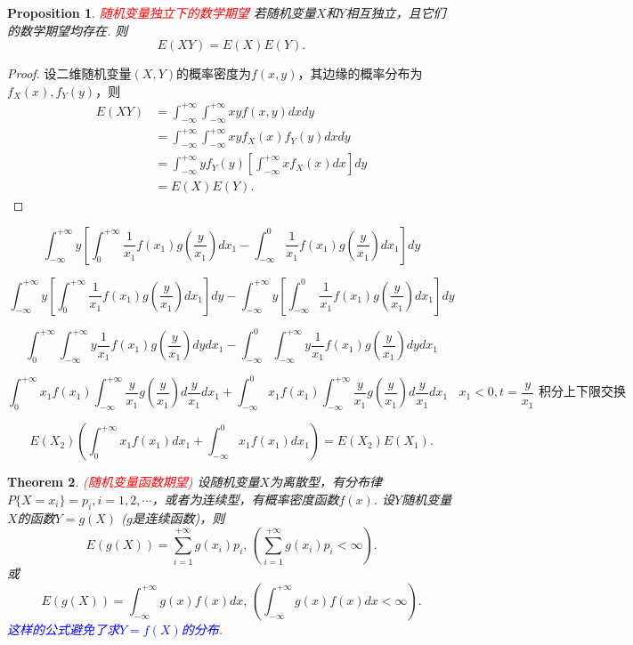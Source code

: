 \documentclass{article}
\newtheorem{theorem}{Theorem}[section]
\newtheorem{proposition}[theorem]{Proposition}
\newcommand{\redt}[1]{\textcolor{red}{#1}}
\newcommand{\bluet}[1]{\textcolor{blue}{#1}}
\begin{document}
\begin{proposition}\label{expectation: independent}
\rm \redt{随机变量独立下的数学期望} 若随机变量$X$和$Y$相互独立，且它们的数学期望均存在. 则
$$
E(XY)=E(X)E(Y).
$$
\end{proposition}

\begin{proof}
\rm 设二维随机变量$(X,Y)$的概率密度为$f(x,y)$，其边缘的概率分布为$f_X(x),f_Y(y)$，则
$$
\begin{array}{ll}
E(XY) &= \int_{-\infty}^{+\infty}\int_{-\infty}^{+\infty} xyf(x,y)dxdy \\
&= \int_{-\infty}^{+\infty}\int_{-\infty}^{+\infty} xyf_X(x)f_Y(y)dxdy \\
&= \int_{-\infty}^{+\infty}yf_Y(y)\left[\int_{-\infty}^{+\infty}xf_X(x)dx\right]dy\\
&=E(X)E(Y).
\end{array}
$$
\end{proof}


$$
\int_{-\infty}^{+\infty}y \left[\int_0^{+\infty} \frac{1}{x_1}f(x_1)g(\frac{y}{x_1})dx_1 - \int_{-\infty}^0 \frac{1}{x_1}f(x_1)g(\frac{y}{x_1})dx_1 \right]dy
$$

$$
\int_{-\infty}^{+\infty}y \left[\int_0^{+\infty} \frac{1}{x_1}f(x_1)g(\frac{y}{x_1})dx_1\right]dy - \int_{-\infty}^{+\infty}y\left[\int_{-\infty}^0 \frac{1}{x_1}f(x_1)g(\frac{y}{x_1})dx_1 \right]dy
$$

$$
\int_0^{+\infty}\int_{-\infty}^{+\infty} y\frac{1}{x_1}f(x_1)g(\frac{y}{x_1})dydx_1 - \int_{-\infty}^0\int_{-\infty}^{+\infty} y\frac{1}{x_1}f(x_1)g(\frac{y}{x_1})dydx_1
$$

$$
\int_0^{+\infty}x_1f(x_1)\int_{-\infty}^{+\infty}\frac{y}{x_1}g(\frac{y}{x_1})d\frac{y}{x_1}dx_1 + \int_{-\infty}^0x_1f(x_1)\int_{-\infty}^{+\infty} \frac{y}{x_1}g(\frac{y}{x_1})d\frac{y}{x_1}dx_1 ~~~~ \text{$x_1 < 0, t=\frac{y}{x_1}$ 积分上下限交换}
$$

$$
E(X_2)\left(\int_0^{+\infty}x_1f(x_1)dx_1 +\int_{-\infty}^0x_1f(x_1)dx_1\right) = E(X_2)E(X_1).
$$


\begin{theorem}
\rm \redt{(随机变量函数期望)} 设随机变量$X$为离散型，有分布律$P\{X=x_i\}=p_i,i=1,2,\cdots$，或者为连续型，有概率密度函数$f(x)$. 设$Y$随机变量$X$的函数$Y=g(X)$ ($g$是连续函数)，则
$$
E(g(X))=\sum\limits_{i=1}^{+\infty}g(x_i)p_i,\,\left(\sum\limits_{i=1}^{+\infty}g(x_i)p_i < \infty \right) .
$$
或
$$
E(g(X)) = \int_{-\infty}^{+\infty}g(x)f(x)dx,\, \left(\int_{-\infty}^{+\infty}g(x)f(x)dx < \infty\right).
$$
\bluet{这样的公式避免了求$Y=f(X)$的分布}.
\end{theorem}
\end{document}
